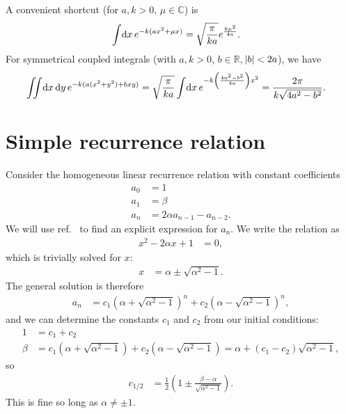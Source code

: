 A convenient shortcut (for $a, k > 0$, $\mu \in \mathbb{C}$) is
\begin{align}
	\int\! \dif x \, e^{-k (a x^2 + \mu x)}
	&= \sqrt{\frac{\pi}{k a}} e^{\frac{k \mu^2}{4 a}}.
		\label{eq:gaussian-integral-kamu}
\end{align}
For symmetrical coupled integrals (with $a, k > 0$, $b \in \mathbb{R}$, $\abs{b} < 2 a$), we have
\begin{align}
	\iint\! \dif x \dif y \, e^{-k (a (x^2 + y^2) + b x y)}
	&= \sqrt{\frac{\pi}{k a}}
		\int\! \dif x \, e^{-k \left( \frac{4 a^2 - b^2}{4 a} \right) x^2}
	= \frac{2 \pi}{k \sqrt{4 a^2 - b^2}}.
		\label{eq:gaussian-integral-coupled}
\end{align}


\section{Simple recurrence relation}

Consider the homogeneous linear recurrence relation with constant coefficients
\begin{subequations}
\begin{align}
	a_0
	&= 1 \\
	a_1
	&= \beta \\
	a_n
	&= 2 \alpha a_{n-1} - a_{n-2}.
\end{align}
\end{subequations}
We will use ref.~\cite[86-91]{slomson1991introduction} to find an explicit expression for $a_n$.
We write the relation as
\begin{align}
	x^2 - 2 \alpha x + 1
	&= 0,
		\label{eq:recurrence-quadratic}
\end{align}
which is trivially solved for $x$:
\begin{align}
	x
	&= \alpha \pm \sqrt{\alpha^2 - 1}.
\end{align}
The general solution is therefore
\begin{align}
	a_n
	&= c_1 \left( \alpha + \sqrt{\alpha^2 - 1} \right)^n + c_2 \left( \alpha - \sqrt{\alpha^2 - 1} \right)^n,
\end{align}
and we can determine the constants $c_1$ and $c_2$ from our initial conditions:
\begin{subequations}
\begin{align}
	1
	&= c_1 + c_2 \\
	\beta
	&= c_1 \left( \alpha + \sqrt{\alpha^2 - 1} \right) + c_2 \left( \alpha - \sqrt{\alpha^2 - 1} \right)
	= \alpha + (c_1 - c_2) \sqrt{\alpha^2 - 1},
\end{align}
\end{subequations}
so
\begin{align}
	c_{1/2}
	&= \frac{1}{2} \left( 1 \pm \frac{\beta - \alpha}{\sqrt{\alpha^2 - 1}} \right).
\end{align}
This is fine so long as $\alpha \ne \pm 1$.

